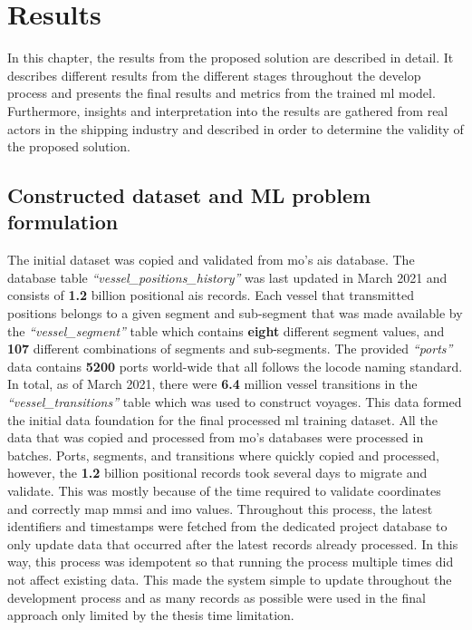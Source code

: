 \chapter{Results}
\label{chap:results}

In this chapter, the results from the proposed solution are described in detail. It describes different results from the different stages throughout the develop process and presents the final results and metrics from the trained \acrfull{ml} model. Furthermore, insights and interpretation into the results are gathered from real actors in the shipping industry and described in order to determine the validity of the proposed solution.

\section{Constructed dataset and ML problem formulation}

The initial dataset was copied and validated from \acrfull{mo}'s \acrshort{ais} database. The database table \textit{``vessel\_positions\_history''} was last updated in March 2021 and consists of \textbf{1.2} billion positional \acrshort{ais} records. Each vessel that transmitted positions belongs to a given segment and sub-segment that was made available by the \textit{``vessel\_segment''} table which contains \textbf{eight} different segment values, and \textbf{107} different combinations of segments and sub-segments. The provided \textit{``ports''} data contains \textbf{5200} ports world-wide that all follows the \gls{locode} naming standard. In total, as of March 2021, there were \textbf{6.4} million vessel transitions in the \textit{``vessel\_transitions''} table which was used to construct voyages. This data formed the initial data foundation for the final processed \acrfull{ml} training dataset. All the data that was copied and processed from \acrshort{mo}'s databases were processed in batches. Ports, segments, and transitions where quickly copied and processed, however, the \textbf{1.2} billion positional records took several days to migrate and validate. This was mostly because of the time required to validate coordinates and correctly map \acrshort{mmsi} and \acrshort{imo} values. Throughout this process, the latest identifiers and timestamps were fetched from the dedicated project database to only update data that occurred after the latest records already processed. In this way, this process was idempotent so that running the process multiple times did not affect existing data. This made the system simple to update throughout the development process and as many records as possible were used in the final approach only limited by the thesis time limitation.


